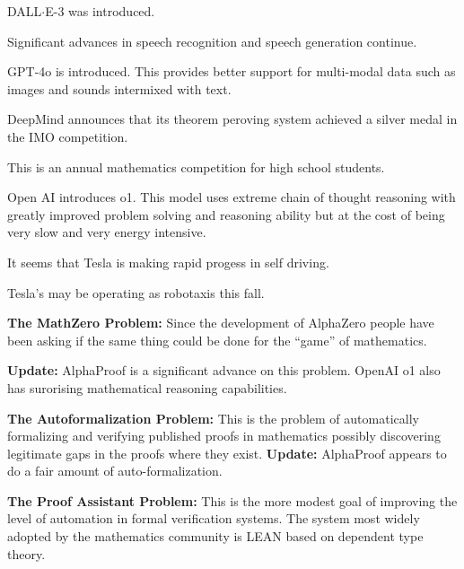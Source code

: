 {{

DALL$\cdot$E-3 was introduced.

\vfill
Significant advances in speech recognition and speech generation continue.


GPT-4o is introduced.  This provides better support for multi-modal data such as images and sounds intermixed with text.


DeepMind announces that its theorem peroving system achieved a silver medal in the IMO competition.

\vfill
This is an annual mathematics competition for high school students.


Open AI introduces o1.  This model uses extreme chain of thought reasoning with greatly improved problem solving and reasoning ability but at the cost
of being very slow and very energy intensive.


It seems that Tesla is making rapid progess in self driving.

\vfill
Tesla's may be operating as robotaxis this fall.


{\bf The MathZero Problem:} Since the development of AlphaZero people have been asking if the same thing could be done for the ``game'' of mathematics.

\vfill
{\bf Update:} AlphaProof is a significant advance on this problem.  OpenAI o1 also has surorising mathematical reasoning capabilities.


{\bf The Autoformalization Problem:} This is the problem of automatically formalizing and verifying published proofs in mathematics possibly discovering legitimate gaps in the proofs where they exist.
\vfill
{\bf Update:} AlphaProof appears to do a fair amount of auto-formalization.


{\bf The Proof Assistant Problem:} This is the more modest goal of improving the level of automation in formal verification systems.  The system
most widely adopted by the mathematics community is LEAN based on dependent type theory.

}}
